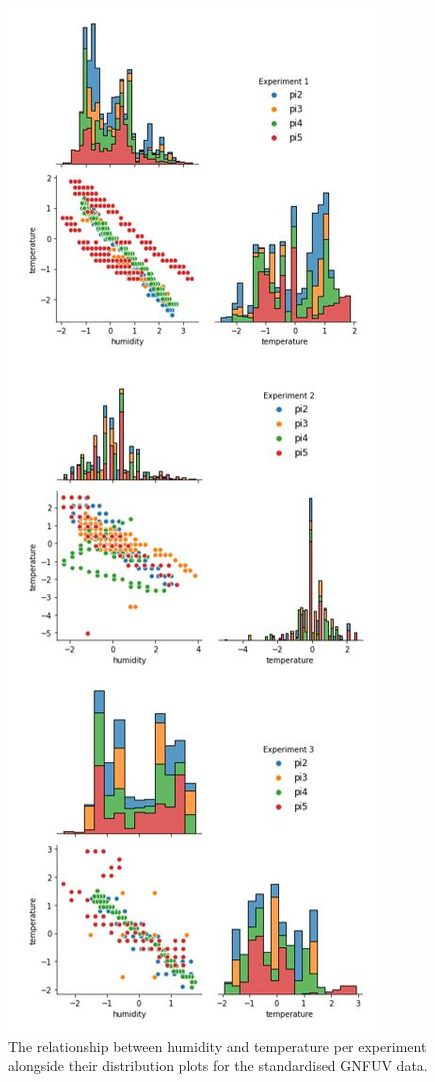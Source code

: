 \documentclass{mpaper}
\begin{document}
\begin{figure}[h]
\centering
\begin{center}
\includegraphics[scale=0.7]{gnfuv_pairplots_std.JPG}
\end{center}
\caption{\label{fig:gnfuv_pairplots_std} The relationship between humidity and temperature per experiment alongside their distribution plots for the standardised GNFUV data.}
\end{figure}
\end{document}
